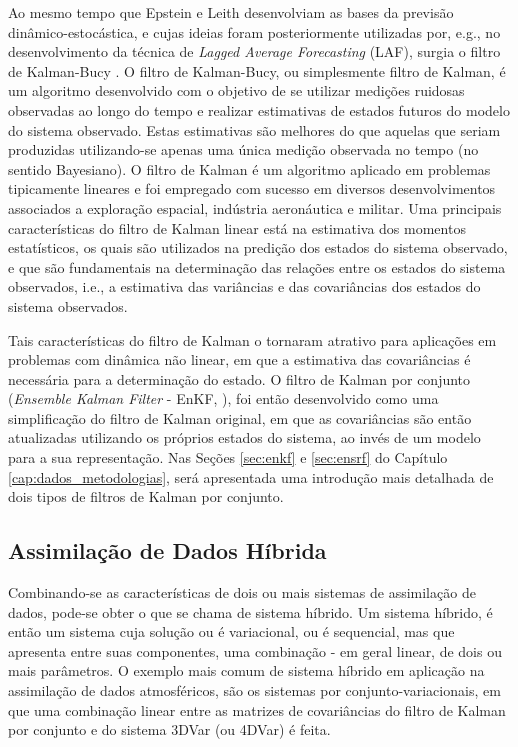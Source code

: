 Ao mesmo tempo que Epstein e Leith desenvolviam as bases da previsão dinâmico-estocástica, e cujas ideias foram posteriormente utilizadas por, e.g.,  no desenvolvimento da técnica de \textit{Lagged Average Forecasting} (LAF), surgia o filtro de Kalman-Bucy \cite{kalmanebucy/1961}. O filtro de Kalman-Bucy, ou simplesmente filtro de Kalman, é um algoritmo desenvolvido com o objetivo de se utilizar medições ruidosas observadas ao longo do tempo e realizar estimativas de estados futuros do modelo do sistema observado. Estas estimativas são melhores do que aquelas que seriam produzidas utilizando-se apenas uma única medição observada no tempo (no sentido Bayesiano). O filtro de Kalman é um algoritmo aplicado em problemas tipicamente lineares e foi empregado com sucesso em diversos desenvolvimentos associados a exploração espacial, indústria aeronáutica e militar. Uma principais características do filtro de Kalman linear está na estimativa dos momentos estatísticos, os quais são utilizados na predição dos estados do sistema observado, e que são fundamentais na determinação das relações entre os estados do sistema observados, i.e., a estimativa das variâncias e das covariâncias dos estados do sistema observados.

Tais características do filtro de Kalman o tornaram atrativo para aplicações em problemas com dinâmica não linear, em que a estimativa das covariâncias é necessária para a determinação do estado. O filtro de Kalman por conjunto (\textit{Ensemble Kalman Filter} - EnKF, ), foi então desenvolvido como uma simplificação do filtro de Kalman original, em que as covariâncias são então atualizadas utilizando os próprios estados do sistema, ao invés de um modelo para a sua representação. Nas Seções \ref{sec:enkf} e \ref{sec:ensrf} do Capítulo \ref{cap:dados_metodologias}, será apresentada uma introdução mais detalhada de dois tipos de filtros de Kalman por conjunto.

\subsection{Assimilação de Dados Híbrida}
\label{tec_hib_assim_dados}

Combinando-se as características de dois ou mais sistemas de assimilação de dados, pode-se obter o que se chama de sistema híbrido. Um sistema híbrido, é então um sistema cuja solução ou é variacional, ou é sequencial, mas que apresenta entre suas componentes, uma combinação - em geral linear, de dois ou mais parâmetros. O exemplo mais comum de sistema híbrido em aplicação na assimilação de dados atmosféricos, são os sistemas por conjunto-variacionais, em que uma combinação linear entre as matrizes de covariâncias do filtro de Kalman por conjunto e do sistema 3DVar (ou 4DVar) é feita.

